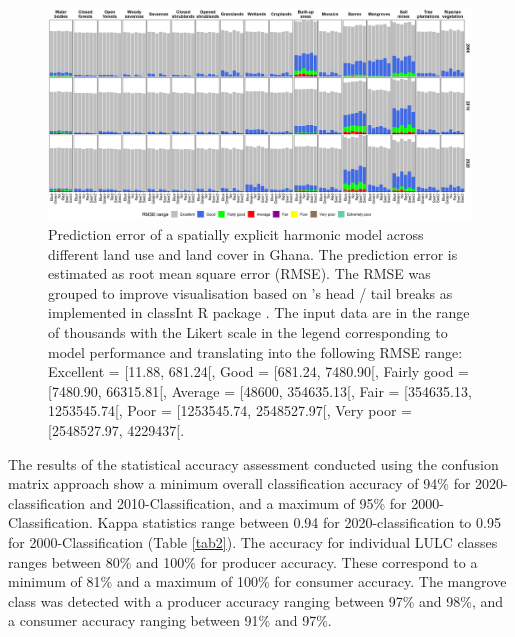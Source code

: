 \documentclass[12pt,oneside,preprint,3p,authoryear,times]{elsarticle} %
\begin{document}
\begin{figure}[!htbp]

{\centering \includegraphics[width=1\linewidth,]{figures/pngs/Ghana_rmse_bars} 

}

\caption{Prediction error of a spatially explicit harmonic model across different land use and land cover in Ghana. The prediction error is estimated as root mean square error (RMSE). The RMSE was grouped to improve visualisation based on \citet{Jiang-2013}’s head / tail breaks as implemented in classInt R package \citep{Bivand-2020}. The input data are in the range of thousands with the Likert scale in the legend corresponding to model performance and translating into the following RMSE range: Excellent = [11.88, 681.24[, Good = [681.24, 7480.90[, Fairly  good = [7480.90, 66315.81[, Average = [48600, 354635.13[, Fair = [354635.13, 1253545.74[, Poor = [1253545.74, 2548527.97[, Very poor = [2548527.97, 4229437[.}\label{fig:fig4}
\end{figure}

The results of the statistical accuracy assessment conducted using the
confusion matrix approach show a minimum overall classification accuracy
of 94\% for 2020-classification and 2010-Classification, and a maximum
of 95\% for 2000-Classification. Kappa statistics range between 0.94 for
2020-classification to 0.95 for 2000-Classification (Table \ref{tab2}).
The accuracy for individual LULC classes ranges between 80\% and 100\%
for producer accuracy. These correspond to a minimum of 81\% and a
maximum of 100\% for consumer accuracy. The mangrove class was detected
with a producer accuracy ranging between 97\% and 98\%, and a consumer
accuracy ranging between 91\% and 97\%.
\end{document}
